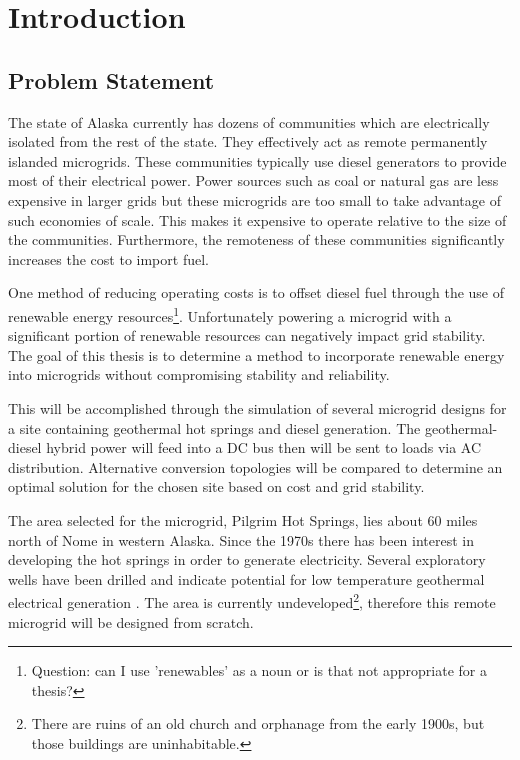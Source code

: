 \chapter{Introduction}

\section{Problem Statement}
The state of Alaska currently has dozens of communities which are electrically isolated from the rest of the state. They effectively act as remote permanently islanded microgrids. These communities typically use diesel generators to provide most of their electrical power. Power sources such as coal or natural gas are less expensive in larger grids but these microgrids are too small to take advantage of such economies of scale. This makes it expensive to operate relative to the size of the communities. Furthermore, the remoteness of these communities significantly increases the cost to import fuel.

One method of reducing operating costs is to offset diesel fuel through the use of renewable energy resources\footnote{Question: can I use 'renewables' as a noun or is that not appropriate for a thesis?}. Unfortunately powering a microgrid with a significant portion of renewable resources can negatively impact grid stability. The goal of this thesis is to determine a method to incorporate renewable energy into microgrids without compromising stability and reliability. 

This will be accomplished through the simulation of several microgrid designs for a site containing geothermal hot springs and diesel generation. The geothermal-diesel hybrid power will feed into a DC bus then will be sent to loads via AC distribution. Alternative conversion topologies will be compared to determine an optimal solution for the chosen site based on cost and grid stability.

The area selected for the microgrid, Pilgrim Hot Springs, lies about 60 miles north of Nome in western Alaska. Since the 1970s there has been interest in developing the hot springs in order to generate electricity. Several exploratory wells have been drilled and indicate potential for low temperature geothermal electrical generation \cite{Holdmann2013}. The area is currently undeveloped\footnote{There are ruins of an old church and orphanage from the early 1900s, but those buildings are uninhabitable.}, therefore this remote microgrid will be designed from scratch.

